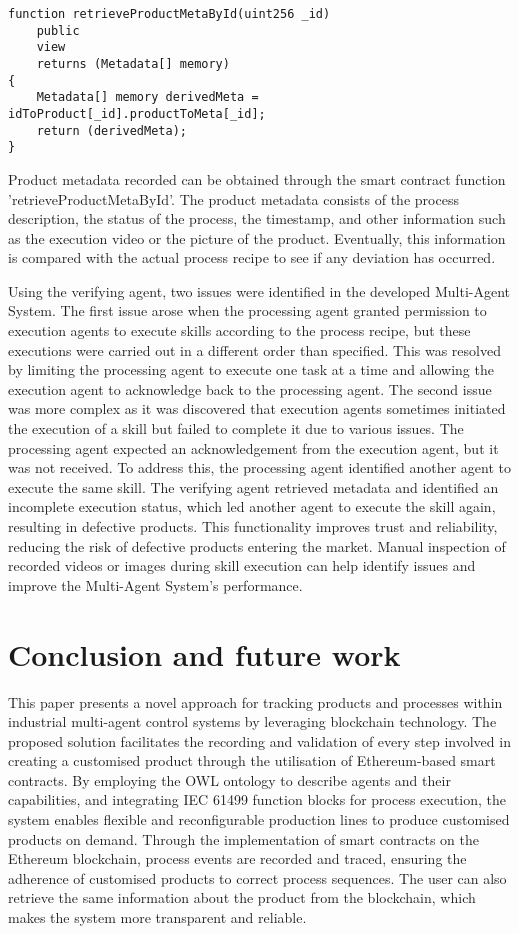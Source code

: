 \documentclass[conference]{IEEEtran}
\begin{document}
\begin{lstlisting}
function retrieveProductMetaById(uint256 _id)
    public
    view
    returns (Metadata[] memory)
{
    Metadata[] memory derivedMeta = idToProduct[_id].productToMeta[_id];
    return (derivedMeta);
}
\end{lstlisting}

Product metadata recorded can be obtained through the smart contract function 'retrieveProductMetaById'. The product metadata consists of the process description, the status of the process, the timestamp, and other information such as the execution video or the picture of the product. Eventually, this information is compared with the actual process recipe to see if any deviation has occurred. 

Using the verifying agent, two issues were identified in the developed Multi-Agent System. The first issue arose when the processing agent granted permission to execution agents to execute skills according to the process recipe, but these executions were carried out in a different order than specified. This was resolved by limiting the processing agent to execute one task at a time and allowing the execution agent to acknowledge back to the processing agent. The second issue was more complex as it was discovered that execution agents sometimes initiated the execution of a skill but failed to complete it due to various issues. The processing agent expected an acknowledgement from the execution agent, but it was not received. To address this, the processing agent identified another agent to execute the same skill. The verifying agent retrieved metadata and identified an incomplete execution status, which led another agent to execute the skill again, resulting in defective products. This functionality improves trust and reliability, reducing the risk of defective products entering the market. Manual inspection of recorded videos or images during skill execution can help identify issues and improve the Multi-Agent System's performance.


\section{Conclusion and future work}
\label{sec:conclusion}

This paper presents a novel approach for tracking products and processes within industrial multi-agent control systems by leveraging blockchain technology. The proposed solution facilitates the recording and validation of every step involved in creating a customised product through the utilisation of Ethereum-based smart contracts. By employing the OWL ontology to describe agents and their capabilities, and integrating IEC 61499 function blocks for process execution, the system enables flexible and reconfigurable production lines to produce customised products on demand. Through the implementation of smart contracts on the Ethereum blockchain, process events are recorded and traced, ensuring the adherence of customised products to correct process sequences. The user can also retrieve the same information about the product from the blockchain, which makes the system more transparent and reliable.
\end{document}
